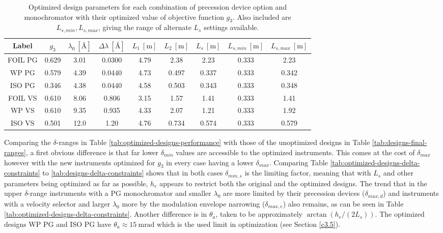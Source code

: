 \begin{table}[h!]
	\centering
	\begin{tabular}{c | c | c c c c c | c c}
		\toprule
		Label & $g_3$ & $\lambda_0 ~[\unit{\angstrom}]$ & $\Delta\lambda ~[\unit{\angstrom}]$ & $L_1 ~[\unit{\meter}]$ & $L_2 ~[\unit{\meter}]$ & $L_s  ~[\unit{\meter}]$ & $L_{s,min}  ~[\unit{\meter}]$& $L_{s, max}  ~[\unit{\meter}]$\\
		\midrule
		FOIL PG & \num{0.629} & \num{3.01} & \num{0.0300} & \num{4.79} & \num{2.38} & \num{2.23} & \num{0.333} & \num{2.23} \\
		WP PG & \num{0.579} & \num{4.39} & \num{0.0440} & \num{4.73} & \num{0.497} & \num{0.337} & \num{0.333} & \num{0.342} \\
		ISO PG & \num{0.346} & \num{4.38} & \num{0.0440} & \num{4.58} & \num{0.503} & \num{0.343} & \num{0.333} & \num{0.348} \\
		FOIL VS & \num{0.610} & \num{8.06} & \num{0.806} & \num{3.15} & \num{1.57} & \num{1.41} & \num{0.333} & \num{1.41} \\
		WP VS & \num{0.610} & \num{9.35} & \num{0.935} & \num{4.33} & \num{2.07} & \num{1.21} & \num{0.333} & \num{1.92} \\
		ISO VS & \num{0.501} & \num{12.0} & \num{1.20} & \num{4.76} & \num{0.734} & \num{0.574} & \num{0.333} & \num{0.579} \\
		\bottomrule
	\end{tabular}
	\caption{Optimized design parameters for each combination of precession device option and monochromator with their optimized value of objective function $g_3$. Also included are $L_{s,min}, L_{s,max}$, giving the range of alternate $L_s$ settings available.}
	\label{tab:optimized-designs}
\end{table}
Comparing the $\delta$-ranges in Table \ref{tab:optimized-designs-performance} with those of the unoptimized designs in Table \ref{tab:designs-final-ranges}, a first obvious difference is that far lower $\delta_{min}$ values are accessible to the optimized instruments. This comes at the cost of $\delta_{max}$ however with the new instruments optimized for $g_3$ in every case having a lower $\delta_{max}$. Comparing Table \ref{tab:optimized-designs-delta-constraints} to \ref{tab:designs-delta-constraints} shows that in both cases $\delta_{min,s}$ is the limiting factor, meaning that with $L_s$ and other parameters being optimized as far as possible, $h_e$ appears to restrict both the original and the optimized designs. The trend that in the upper $\delta$-range instruments with a PG monochromator and smaller $\lambda_0$ are more limited by their precession devices ($\delta_{max,d}$) and instruments with a velocity selector and larger $\lambda_0$ more by the modulation envelope narrowing ($\delta_{max,e}$) also remains, as can be seen in Table \ref{tab:optimized-designs-delta-constraints}. Another difference is in $\theta_a$, taken to be approximately $\arctan(h_e/(2L_s))$. The optimized designs WP PG and ISO PG have $\theta_a \approx \SI{15}{\milli\radian}$ which is the used limit in optimization (see Section \ref{c3.5}).


